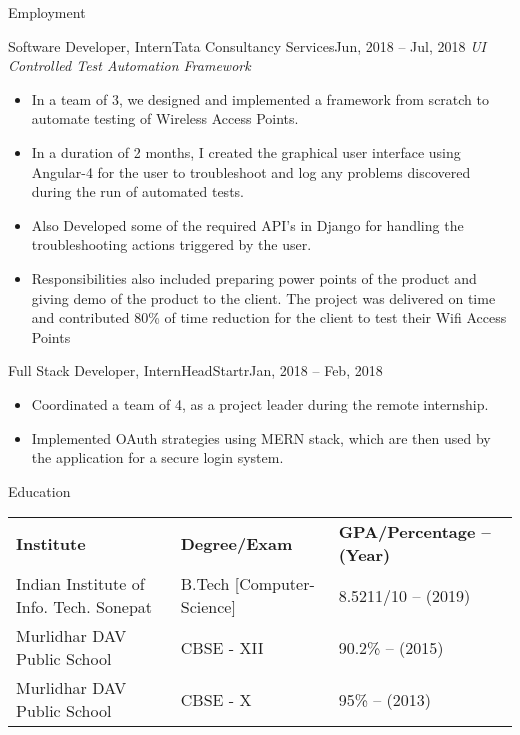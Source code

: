 \documentclass[]{format}
\begin{document}
\begin{cvsection}{Employment}
		\begin{cvsubsection}{Software Developer, Intern}{Tata Consultancy Services}{Jun, 2018 – Jul, 2018}
		    \textit{UI Controlled Test Automation Framework}
			\begin{itemize}
				\item In a team of 3, we designed and implemented a framework from scratch to automate testing of Wireless Access Points.
				\item In a duration of 2 months, I created the graphical user interface using Angular-4 for the user to troubleshoot and log any problems discovered during the run of automated tests.
				\item Also Developed some of the required API’s in Django for handling the troubleshooting actions triggered by the user.
				\item Responsibilities also included preparing power points of the product and giving demo of the product to the client. The project was delivered on time and contributed 80\% of time reduction for the client to test their Wifi Access Points
			\end{itemize}
		\end{cvsubsection}
		
		\begin{cvsubsection}{Full Stack Developer, Intern}{HeadStartr}{Jan, 2018 – Feb, 2018}		
			\begin{itemize}
				\item Coordinated a team of 4, as a project leader during the remote internship.
				\item Implemented OAuth strategies using MERN stack, which are then used by the application for a secure login system.
			\end{itemize}
		\end{cvsubsection}
		
	\end{cvsection}
	
	\vspace{-5pt}
	
	\begin{cvsection}{Education}
	
	    \vspace{2pt}
	
		\begin{tabu} to 1\textwidth { X[l,p] X[c,p] X[r,p] }
			\textbf{Institute} & \textbf{Degree/Exam} & \textbf{GPA/Percentage – (Year)} \\
			Indian Institute of Info. Tech. Sonepat & B.Tech [Computer-Science] & 8.5211/10 – (2019) \\
			Murlidhar DAV Public School & CBSE - XII & 90.2\% – (2015) \\
			Murlidhar DAV Public School & CBSE - X & 95\% – (2013)
		\end{tabu}
		
	\end{cvsection}
\end{document}
